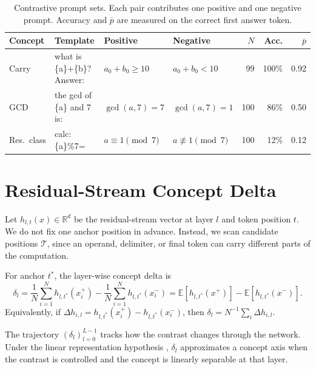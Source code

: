 \begin{table}[ht!]
\centering
\setlength{\tabcolsep}{4pt}
\footnotesize
\begin{tabular}{@{}l l l l r r r@{}}
\toprule
Concept & Template
        & Positive
        & Negative
        & $N$
        & Acc.
        & $\bar{p}$ \\
\midrule
Carry
  & {\sffamily\scriptsize what is \{a\}+\{b\}? Answer:}
  & $a_0{+}b_0\!\geq\!10$
  & $a_0{+}b_0\!<\!10$
  & 99 & 100\% & 0.92 \\[3pt]
GCD
  & {\sffamily\scriptsize the gcd of \{a\} and 7 is:}
  & $\gcd(a,7)=7$
  & $\gcd(a,7)=1$
  & 100 & 86\% & 0.50 \\[3pt]
Res.\ class
  & {\sffamily\scriptsize calc: \{a\}\%7=}
  & $a \equiv 1 \pmod{7}$
  & $a \not\equiv 1 \pmod{7}$
  & 100 & 12\% & 0.12 \\
\bottomrule
\end{tabular}
\caption{Contrastive prompt sets.  Each pair contributes one positive and one
negative prompt.  Accuracy and $\bar{p}$ are measured on the correct first
answer token.}
\label{tab:concept_pairs}
\end{table}

\section{Residual-Stream Concept Delta}
\label{sec:concept_delta}

Let \(h_{l,t}(x) \in \mathbb{R}^d\) be the residual-stream vector at layer \(l\)
and token position \(t\). We do not fix one anchor position in advance. Instead,
we scan candidate positions \(\mathcal{T}\), since an operand, delimiter, or final
token can carry different parts of the computation.

For anchor \(t^*\), the layer-wise concept delta is
\begin{equation}
\delta_l
=
\frac{1}{N}\sum_{i=1}^{N} h_{l,t^*}(x_i^+)
-
\frac{1}{N}\sum_{i=1}^{N} h_{l,t^*}(x_i^-)
=
\mathbb{E}[h_{l,t^*}(x^+)]-\mathbb{E}[h_{l,t^*}(x^-)].
\label{eq:concept_delta}
\end{equation}
Equivalently, if \(\Delta h_{i,l}=h_{l,t^*}(x_i^+)-h_{l,t^*}(x_i^-)\), then
\(\delta_l=N^{-1}\sum_i \Delta h_{i,l}\).

The trajectory \((\delta_l)_{l=0}^{L-1}\) tracks how the contrast changes through
the network. Under the linear representation hypothesis \citep{park2023linear},
\(\delta_l\) approximates a concept axis when the contrast is controlled and the
concept is linearly separable at that layer.

